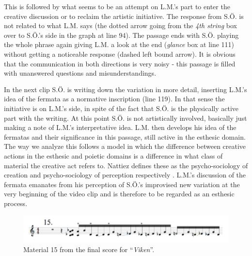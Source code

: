\documentclass[10pt,letterpaper]{article}
\begin{document}

This is followed by what seems to be an attempt on L.M.'s part to enter
the creative discussion or to reclaim the artistic initiative. The
response from S.{\"O}. is not related to what L.M. says (the dotted arrow
going from the \emph{4th string} box over to S.{\"O}.'s side in the graph
at line 94). The passage ends with S.{\"O}. playing the whole phrase again
giving L.M. a look at the end (\emph{glance} box at line 111) without
getting a noticeable response (dashed left bound arrow). It is obvious
that the communication in both directions is very noisy - this passage
is filled with unanswered questions and misunderstandings.

In the next clip S.{\"O}. is writing down the variation in more detail,
inserting L.M.'s idea of the fermata as a normative inscription (line
119). In that sense the initiative is on L.M.'s side, in spite of the
fact that S.{\"O}. is the physically active part with the writing. At this
point S.{\"O}. is not artistically involved, basically just making a note
of L.M.'s interpretative idea. L.M. then develops his idea of the
fermatas and their significance in this passage, still active in the
esthesic domain. The way we analyze this follows a model in which the
difference between creative actions in the esthesic and poietic domains
is a difference in what class of material the creative act refers
to. Nattiez defines these as the psycho-sociology of creation and
psycho-sociology of perception respectively \cite{nattiez}. L.M.'s discussion of the
fermata emanates from his perception of S.{\"O}.'s improvised new
variation at the very beginning of the video clip and is therefore to be
regarded as an esthesic process.

\begin{figure}[!hbp]
\includegraphics[width=1.0\columnwidth]{img/viken15}
\caption{Material 15 from the final score for ``\emph{Viken}''.}
\label{viken15}
\end{figure}
\end{document}
